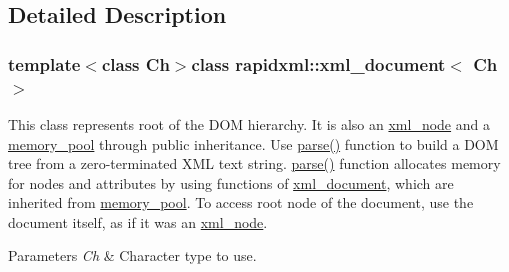 \subsection{Detailed Description}
\subsubsection*{template$<$class Ch$>$class rapidxml\-::xml\-\_\-document$<$ Ch $>$}

This class represents root of the D\-O\-M hierarchy. It is also an \hyperlink{classrapidxml_1_1xml__node}{xml\-\_\-node} and a \hyperlink{classrapidxml_1_1memory__pool}{memory\-\_\-pool} through public inheritance. Use \hyperlink{classrapidxml_1_1xml__document_ac6e73ff9ac323bf5a370c38feb03a6b1}{parse()} function to build a D\-O\-M tree from a zero-\/terminated X\-M\-L text string. \hyperlink{classrapidxml_1_1xml__document_ac6e73ff9ac323bf5a370c38feb03a6b1}{parse()} function allocates memory for nodes and attributes by using functions of \hyperlink{classrapidxml_1_1xml__document}{xml\-\_\-document}, which are inherited from \hyperlink{classrapidxml_1_1memory__pool}{memory\-\_\-pool}. To access root node of the document, use the document itself, as if it was an \hyperlink{classrapidxml_1_1xml__node}{xml\-\_\-node}. 
\begin{DoxyParams}{Parameters}
{\em Ch} & Character type to use. \\
\hline
\end{DoxyParams}


